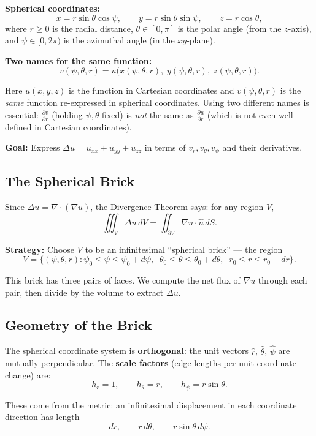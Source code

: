 \documentclass[11pt]{report}
\newcommand{\parti}[2]{\frac{\partial #1}{\partial #2}}
\begin{document}
\textbf{Spherical coordinates:}
\[
x = r\sin\theta\cos\psi, \qquad y = r\sin\theta\sin\psi, \qquad z = r\cos\theta,
\]
where $r \geq 0$ is the radial distance, $\theta \in [0, \pi]$ is the polar angle (from the $z$-axis), and $\psi \in [0, 2\pi)$ is the azimuthal angle (in the $xy$-plane).

\textbf{Two names for the same function:}
\[
v(\psi, \theta, r) = u\big(x(\psi, \theta, r), \; y(\psi, \theta, r), \; z(\psi, \theta, r)\big).
\]

Here $u(x,y,z)$ is the function in Cartesian coordinates and $v(\psi, \theta, r)$ is the \textit{same} function re-expressed in spherical coordinates. Using two different names is essential: $\parti{v}{r}$ (holding $\psi, \theta$ fixed) is \textit{not} the same as $\parti{u}{r}$ (which is not even well-defined in Cartesian coordinates).

\textbf{Goal:} Express $\Delta u = u_{xx} + u_{yy} + u_{zz}$ in terms of $v_r, v_\theta, v_\psi$ and their derivatives.

\subsection{The Spherical Brick}

Since $\Delta u = \nabla \cdot (\nabla u)$, the Divergence Theorem says: for any region $V$,
\[
\iiint_V \Delta u \, dV = \iint_{\partial V} \nabla u \cdot \hat{n} \, dS.
\]

\textbf{Strategy:} Choose $V$ to be an infinitesimal ``spherical brick'' --- the region
\[
V = \{(\psi, \theta, r) : \psi_0 \leq \psi \leq \psi_0 + d\psi, \;\; \theta_0 \leq \theta \leq \theta_0 + d\theta, \;\; r_0 \leq r \leq r_0 + dr\}.
\]

This brick has three pairs of faces. We compute the net flux of $\nabla u$ through each pair, then divide by the volume to extract $\Delta u$.

\subsection*{Geometry of the Brick}

The spherical coordinate system is \textbf{orthogonal}: the unit vectors $\hat{r}$, $\hat{\theta}$, $\hat{\psi}$ are mutually perpendicular. The \textbf{scale factors} (edge lengths per unit coordinate change) are:
\[
h_r = 1, \qquad h_\theta = r, \qquad h_\psi = r\sin\theta.
\]

These come from the metric: an infinitesimal displacement in each coordinate direction has length
\[
dr, \qquad r \, d\theta, \qquad r\sin\theta \, d\psi.
\]
\end{document}
